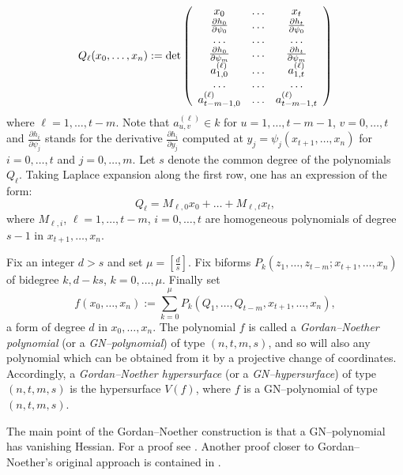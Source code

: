 \documentclass[11pt,a4paper]{amsart}
\begin{document}
\begin{displaymath}
Q_\ell(x_0,\ldots ,x_n):={\rm det}
\left(
\begin{array}{ccc}
x_0 & \ldots & x_t \\
\frac{\partial h_0}{\partial \psi_0} & \ldots & \frac{\partial h_t}{\partial \psi_0} \\
\ldots & \ldots & \ldots \\
\frac{\partial h_0}{\partial \psi_m} & \ldots & \frac{\partial h_t}{\partial \psi_m} \\
a_{1,0}^{(\ell)} & \ldots & a_{1,t}^{(\ell)} \\
\ldots & \ldots & \ldots \\
a_{t-m-1,0}^{(\ell)} & \ldots & a_{t-m-1,t}^{(\ell)}
\end{array}
\right)
\end{displaymath}
where $\ell =1,\ldots ,t-m$. Note that $a_{u,v}^{(\ell)}\in k$ for $u=1,\ldots ,t-m-1$, $v=0,\ldots ,t$ and $\frac{\partial h_i}{\partial \psi_j}$ stands for the derivative
$\frac{\partial h_i}{\partial y_j}$ computed at $y_j=\psi_j(x_{t+1}, \ldots ,x_n)$ for $i=0,\ldots ,t$ and $j=0,\ldots ,m$.
Let $s$ denote the common degree of the polynomials $Q_\ell$. Taking Laplace expansion along the first row, one has an expression of the form:
$$Q_\ell =M_{\ell ,0}x_0+\ldots +M_{\ell ,t}x_t,$$
where $M_{\ell ,i}$, $\ell=1,\ldots ,t-m$, $i=0,\ldots ,t$ are homogeneous polynomials  of degree
$s-1$ in $x_{t+1}, \ldots ,x_n$.

Fix an integer  $d>s$ and set $\mu =[\frac{d}{s}]$. Fix biforms $P_k(z_{1}, \ldots ,z_{t-m};x_{t+1}, \ldots ,x_n)$ of bidegree $k, d-ks$, $k=0,\ldots ,\mu$. Finally set
\begin{equation}\label{equGN}
f(x_0,\ldots ,x_n):=\sum_{k=0}^{\mu} P_k(Q_1,\ldots ,Q_{t-m},x_{t+1},\ldots ,x_n),
\end{equation}
a form of degree $d$ in $x_0,\ldots ,x_n$. The polynomial $f$ is called a {\it Gordan--Noether polynomial} (or a {\it GN--polynomial}) of type $(n,t,m,s)$, and so will also any polynomial which can be obtained from it by a projective change of coordinates. Accordingly,
 a {\it Gordan--Noether hypersurface} (or a {\it GN--hypersurface}) of type $(n,t,m,s)$ is the hypersurface $V(f)$, where $f$ is a  GN--polynomial of type $(n,t,m,s)$.

The main point of the Gordan--Noether construction is that a
GN--polynomial has vanishing Hessian. For a proof see
\cite[Proposition 2.9]{CilibertoRussoSimis}. Another proof closer
to Gordan--Noether's original approach is contained in
\cite{Lossen}.
\end{document}
